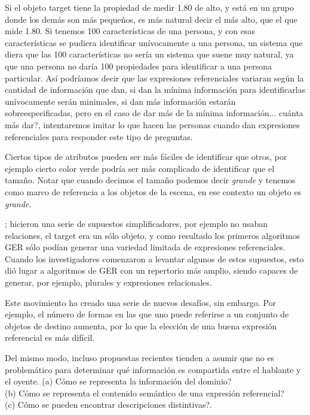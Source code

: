 Si el objeto target tiene la propiedad de medir 1.80 de alto, y est\'a en un grupo donde los dem\'as son m\'as peque\~nos, es m\'as natural decir el m\'as alto, que el que mide 1.80.
Si tenemos 100 caracter\'isticas de una persona, y con esas caracter\'isticas se pudiera identificar un\'ivocamente a una persona, un sistema que diera que las 100 caracter\'isticas no ser\'ia un sistema que suene muy natural, ya que una persona no dar\'ia 100 propiedades para identificar a una persona particular. As\'i podr\'iamos decir que las expresiones referenciales variaran seg\'un la cantidad de informaci\'on que dan, si dan la m\'inima informaci\'on para identificarlas un\'ivocamente ser\'an minimales, si dan m\'as informaci\'on estar\'an sobreespecificadas, pero en el caso de dar m\'as de la m\'inima informaci\'on... cu\'anta m\'as dar?, intentaremos imitar lo que hacen las personas cuando dan expresiones referenciales para responder este tipo de preguntas.

Ciertos tipos de atributos pueden ser m\'as f\'aciles de identificar que otros, por ejemplo cierto color verde podr\'{i}a ser m\'as complicado de identificar que el tama\~no. Notar que cuando decimos el tama\~no podemos decir {\it grande} y tenemos como marco de referencia a los objetos de la escena, en ese contexto un objeto es {\it grande}.

\cite{C92-1038}; \cite{Dale95computationalinterpretations} hicieron una serie de supuestos simplificadores, por ejemplo no usaban relaciones, el target era un s\'olo objeto, y como resultado los primeros
algoritmos GER s\'olo pod\'ian generar una variedad limitada de expresiones referenciales. Cuando
los investigadores comenzaron a levantar algunos de estos supuestos, esto di\'o lugar a algoritmos de GER
con un repertorio m\'as amplio, siendo capaces de generar, por ejemplo, plurales y expresiones relacionales. 

Este movimiento ha creado una serie de nuevos desaf\'ios, sin embargo. Por ejemplo, el
n\'umero de formas en las que uno puede referirse a un conjunto de objetos de destino aumenta, por lo que la elecci\'on de una
buena expresi\'on referencial es m\'as dif\'icil.

Del mismo modo, incluso propuestas recientes tienden a asumir que no es problem\'atico para determinar qu\'e informaci\'on
es compartida entre el hablante y el oyente.
(a) C\'omo se representa la informaci\'on del dominio?\\
(b) C\'omo se representa el contenido sem\'antico de una expresi\'on referencial? \\
(c) C\'omo se pueden encontrar descripciones distintivas?.

